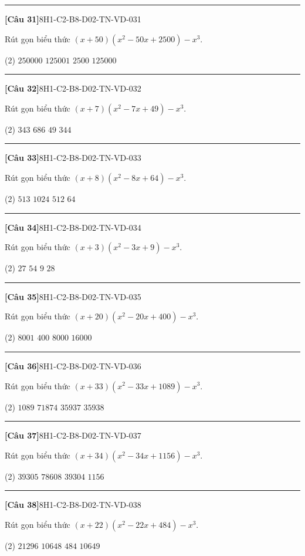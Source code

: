 \documentclass[12pt,a4paper]{article}
\newif\ifloigiai
\newenvironment{cauhoi}[2]{%
  \par\medskip\noindent\rule{\textwidth}{0.4pt}\par\nopagebreak
  \noindent\textbf{[#1]}\hfill{\scriptsize\ttfamily #2}\par\nopagebreak\smallskip}{\par}
\newcommand{\dapan}[1]{\ifloigiai\par\smallskip\noindent\textit{Đáp án:} \textbf{#1}\par\fi}
\begin{document}
\begin{cauhoi}{Câu 31}{8H1-C2-B8-D02-TN-VD-031}
Rút gọn biểu thức $(x+50)(x^{2}-50x+2500)-x^{3}$.
\begin{tasks}(2)
\task $250000$
\task $125001$
\task $2500$
\task $125000$
\end{tasks}
\dapan{D}
\end{cauhoi}
\begin{cauhoi}{Câu 32}{8H1-C2-B8-D02-TN-VD-032}
Rút gọn biểu thức $(x+7)(x^{2}-7x+49)-x^{3}$.
\begin{tasks}(2)
\task $343$
\task $686$
\task $49$
\task $344$
\end{tasks}
\dapan{A}
\end{cauhoi}
\begin{cauhoi}{Câu 33}{8H1-C2-B8-D02-TN-VD-033}
Rút gọn biểu thức $(x+8)(x^{2}-8x+64)-x^{3}$.
\begin{tasks}(2)
\task $513$
\task $1024$
\task $512$
\task $64$
\end{tasks}
\dapan{C}
\end{cauhoi}
\begin{cauhoi}{Câu 34}{8H1-C2-B8-D02-TN-VD-034}
Rút gọn biểu thức $(x+3)(x^{2}-3x+9)-x^{3}$.
\begin{tasks}(2)
\task $27$
\task $54$
\task $9$
\task $28$
\end{tasks}
\dapan{A}
\end{cauhoi}
\begin{cauhoi}{Câu 35}{8H1-C2-B8-D02-TN-VD-035}
Rút gọn biểu thức $(x+20)(x^{2}-20x+400)-x^{3}$.
\begin{tasks}(2)
\task $8001$
\task $400$
\task $8000$
\task $16000$
\end{tasks}
\dapan{C}
\end{cauhoi}
\begin{cauhoi}{Câu 36}{8H1-C2-B8-D02-TN-VD-036}
Rút gọn biểu thức $(x+33)(x^{2}-33x+1089)-x^{3}$.
\begin{tasks}(2)
\task $1089$
\task $71874$
\task $35937$
\task $35938$
\end{tasks}
\dapan{C}
\end{cauhoi}
\begin{cauhoi}{Câu 37}{8H1-C2-B8-D02-TN-VD-037}
Rút gọn biểu thức $(x+34)(x^{2}-34x+1156)-x^{3}$.
\begin{tasks}(2)
\task $39305$
\task $78608$
\task $39304$
\task $1156$
\end{tasks}
\dapan{C}
\end{cauhoi}
\begin{cauhoi}{Câu 38}{8H1-C2-B8-D02-TN-VD-038}
Rút gọn biểu thức $(x+22)(x^{2}-22x+484)-x^{3}$.
\begin{tasks}(2)
\task $21296$
\task $10648$
\task $484$
\task $10649$
\end{tasks}
\dapan{B}
\end{cauhoi}
\end{document}
